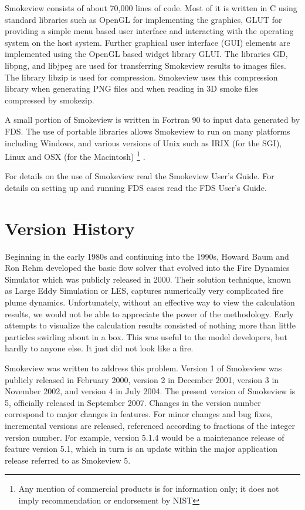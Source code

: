 \documentclass[11pt,twoside]{book}
\begin{document}
Smokeview consists of about 70,000 lines of code.  Most of it is
written in C using standard libraries such as
OpenGL\cite{OpenGLRed} for implementing the graphics, GLUT\cite{OpenGLGlut} for providing a
simple menu based user interface and interacting with the operating system on the host system.
Further graphical user interface (GUI) elements are implemented using the
OpenGL based widget library GLUI\cite{GLUILIB}.
The libraries GD\cite{GDLIB}, libpng\cite{PNGLIB},
and libjpeg\cite{JPEGLIB} are used for transferring Smokeview results to images files.  The library
libzip\cite{ZLIB} is used for compression.  Smokeview uses this compression library when generating PNG files and when reading in 3D smoke files compressed by smokezip.

A small portion of Smokeview is written in Fortran 90 to input data
generated by FDS.  The use of portable libraries allows Smokeview
to run on many platforms including Windows, and various versions
of Unix such as IRIX (for the SGI), Linux and OSX (for the
Macintosh)
\footnote{
Any mention of commercial products is for information only;  it does not imply recommendation or endorsement by NIST}
.

For details on the use of Smokeview read the Smokeview User's
Guide\cite{Smokeview_Users_Guide_5}. For details on setting up and
running FDS cases read the FDS User's
Guide\cite{FDS_Users_Guide_5}.

\section{Version History}

Beginning in the early 1980s and continuing into the 1990s, Howard Baum and Ron Rehm developed the basic flow solver that evolved into the Fire Dynamics Simulator which was publicly released in 2000.  Their solution technique, known as Large Eddy Simulation or LES, captures numerically very complicated fire plume dynamics.  Unfortunately, without an effective way to view the calculation results, we would not be able to appreciate the power of the methodology.  Early attempts to visualize the calculation results consisted of nothing more than little particles swirling about in a box.  This was useful to the model developers, but hardly to anyone else.  It just did not look like a fire.

Smokeview was written to address this problem.
Version 1 of Smokeview was publicly released in February 2000, version 2 in December 2001, version 3 in November 2002, and version 4 in July 2004.
The present version of Smokeview is 5, officially released in September 2007. Changes in
the version number correspond to major changes in features. For minor changes and bug fixes, incremental
versions are released, referenced according to fractions of the integer
version number. For example, version 5.1.4 would be a maintenance release of feature
version 5.1, which in turn is an update within the major application release referred to as Smokeview 5.
\end{document}
